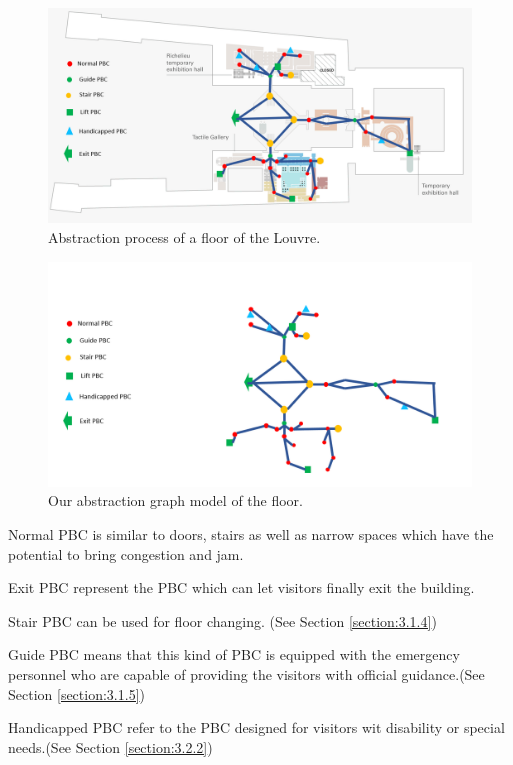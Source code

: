 \documentclass[12pt]{article}
\begin{document}
\begin{figure}[htb]
	\centering
	\includegraphics[scale=0.3]{figure1.png}
	\caption{Abstraction process of a floor of the Louvre.}
	\label{fig:fig5}
\end{figure}
\begin{figure}[htb]
	\centering
	\includegraphics[scale=0.3]{figure2.png}
	\caption{Our abstraction graph model of the floor.}
	\label{fig:fig6}
\end{figure}



Normal PBC is similar to doors, stairs as well as narrow spaces which have the potential to bring congestion and jam.

Exit PBC represent the PBC which can let visitors finally exit the building.

Stair PBC can be used for floor changing. (See Section \ref{section:3.1.4})

Guide PBC means that this kind of PBC is equipped with 
the emergency personnel who are capable of providing the
 visitors with official guidance.(See Section \ref{section:3.1.5})

Handicapped PBC refer to the PBC designed for visitors wit disability or special needs.(See Section \ref{section:3.2.2})
\end{document}

